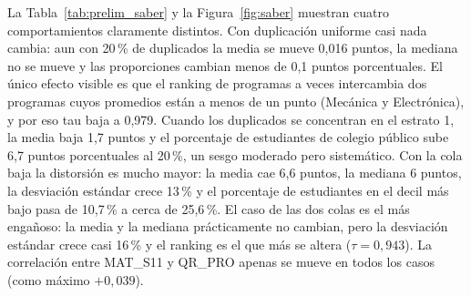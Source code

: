 \documentclass[11pt,openany,oneside,letterpaper]{book}
\begin{document}
La Tabla~\ref{tab:prelim_saber} y la Figura~\ref{fig:saber} muestran cuatro comportamientos claramente distintos. Con duplicación uniforme casi nada cambia: aun con 20\,\% de duplicados la media se mueve 0,016 puntos, la mediana no se mueve y las proporciones cambian menos de 0,1 puntos porcentuales. El único efecto visible es que el ranking de programas a veces intercambia dos programas cuyos promedios están a menos de un punto (Mecánica y Electrónica), y por eso tau baja a 0,979. Cuando los duplicados se concentran en el estrato 1, la media baja 1,7 puntos y el porcentaje de estudiantes de colegio público sube 6,7 puntos porcentuales al 20\,\%, un sesgo moderado pero sistemático. Con la cola baja la distorsión es mucho mayor: la media cae 6,6 puntos, la mediana 6 puntos, la desviación estándar crece 13\,\% y el porcentaje de estudiantes en el decil más bajo pasa de 10,7\,\% a cerca de 25,6\,\%. El caso de las dos colas es el más engañoso: la media y la mediana prácticamente no cambian, pero la desviación estándar crece casi 16\,\% y el ranking es el que más se altera ($\tau = 0{,}943$). La correlación entre MAT\_S11 y QR\_PRO apenas se mueve en todos los casos (como máximo $+0{,}039$).
\end{document}
